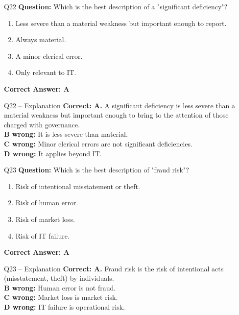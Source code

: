 \documentclass[aspectratio=169,10pt]{beamer}
\begin{document}
	\begin{frame}[t]{Q22}
		\small
		\textbf{Question:} Which is the best description of a "significant deficiency"?
		\begin{enumerate}[label=\Alph*.,itemsep=1pt,topsep=2pt]
			\item Less severe than a material weakness but important enough to report.
			\item Always material.
			\item A minor clerical error.
			\item Only relevant to IT.
		\end{enumerate}
		\vspace{4pt}
		\textbf{Correct Answer: A}
	\end{frame}
	
	\begin{frame}[t]{Q22 -- Explanation}
		\small
		\textbf{Correct: A.} A significant deficiency is less severe than a material weakness but important enough to bring to the attention of those charged with governance. \\[4pt]
		\textbf{B wrong:} It is less severe than material. \\[2pt]
		\textbf{C wrong:} Minor clerical errors are not significant deficiencies. \\[2pt]
		\textbf{D wrong:} It applies beyond IT.
	\end{frame}
	
	\begin{frame}[t]{Q23}
		\small
		\textbf{Question:} Which is the best description of "fraud risk"?
		\begin{enumerate}[label=\Alph*.,itemsep=1pt,topsep=2pt]
			\item Risk of intentional misstatement or theft.
			\item Risk of human error.
			\item Risk of market loss.
			\item Risk of IT failure.
		\end{enumerate}
		\vspace{4pt}
		\textbf{Correct Answer: A}
	\end{frame}
	
	\begin{frame}[t]{Q23 -- Explanation}
		\small
		\textbf{Correct: A.} Fraud risk is the risk of intentional acts (misstatement, theft) by individuals. \\[4pt]
		\textbf{B wrong:} Human error is not fraud. \\[2pt]
		\textbf{C wrong:} Market loss is market risk. \\[2pt]
		\textbf{D wrong:} IT failure is operational risk.
	\end{frame}
	
\end{document}
